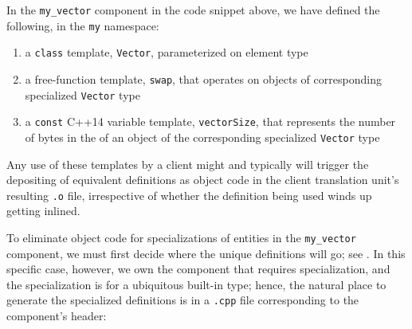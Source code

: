 \noindent In the \lstinline!my_vector! component in the code snippet above, we
have defined the following, in the \lstinline!my! namespace:
\begin{enumerate}
\item{a \lstinline!class! template, \lstinline!Vector!, parameterized on element type}
\item{a free-function template, \lstinline!swap!, that operates on objects of corresponding specialized \lstinline!Vector! type}
\item{a \lstinline!const! C++14 variable template, 
\lstinline!vectorSize!, that represents the number of bytes in the  of an object of the corresponding specialized \lstinline!Vector! type}
\end{enumerate}
Any use of these templates by a client might and typically will trigger
the depositing of equivalent definitions as object code in the client
translation unit's resulting \lstinline!.o! file, irrespective of whether
the definition being used winds up getting inlined.

To eliminate object code for specializations of entities in the
\lstinline!my_vector! component, we must first decide where the unique
definitions will go; see . In this
specific case, however, we own the component that requires
specialization, and the specialization is for a ubiquitous built-in type;
hence, the natural place to generate the specialized definitions is in a
\lstinline!.cpp! file corresponding to the component's header:

